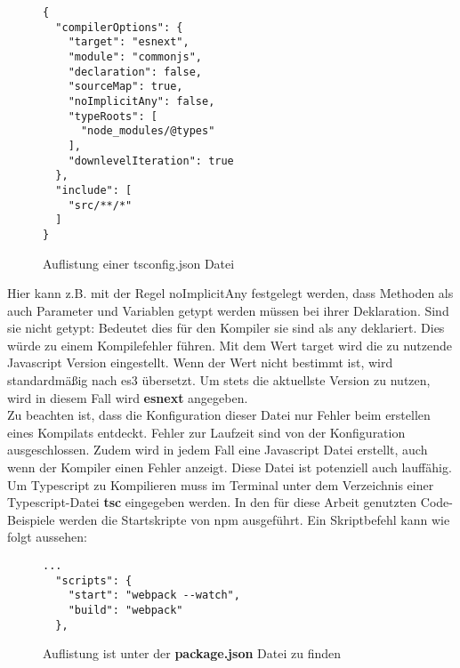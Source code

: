 \begin{figure}[H]
\begin{lstlisting}[basicstyle=\small]
{
  "compilerOptions": {
    "target": "esnext",
    "module": "commonjs",
    "declaration": false,
    "sourceMap": true,
    "noImplicitAny": false,
    "typeRoots": [
      "node_modules/@types"
    ],
    "downlevelIteration": true
  },
  "include": [
    "src/**/*"
  ]
} 
\end{lstlisting}
\caption{Auflistung einer tsconfig.json Datei}
\end{figure}

\noindent
Hier kann z.B. mit der Regel \glqq noImplicitAny\grqq{} festgelegt werden, dass Methoden als auch Parameter und Variablen getypt werden müssen bei ihrer Deklaration. Sind sie nicht getypt: Bedeutet dies für den Kompiler sie sind als any deklariert. Dies würde zu einem Kompilefehler führen.\cite{tsconfig} Mit dem Wert \glqq target\grqq{} wird die zu nutzende Javascript Version eingestellt. Wenn der Wert nicht bestimmt ist, wird standardmäßig nach es3 übersetzt. Um stets die aktuellste Version zu nutzen, wird in diesem Fall wird \textbf{esnext} angegeben.\\

\noindent
Zu beachten ist, dass die Konfiguration dieser Datei nur Fehler beim erstellen eines Kompilats entdeckt. Fehler zur Laufzeit sind von der Konfiguration ausgeschlossen. Zudem wird in jedem Fall eine Javascript Datei erstellt, auch wenn der Kompiler einen Fehler anzeigt. Diese Datei ist potenziell auch lauffähig. Um Typescript zu Kompilieren muss im Terminal unter dem Verzeichnis einer Typescript-Datei \textbf{tsc} eingegeben werden. In den für diese Arbeit genutzten Code-Beispiele werden die Startskripte von npm ausgeführt. Ein Skriptbefehl kann wie folgt aussehen:

\begin{figure}[H]
\begin{lstlisting}[basicstyle=\small]
  ...
  "scripts": {
    "start": "webpack --watch",
    "build": "webpack"
  }, 
\end{lstlisting}
\caption{Auflistung ist unter der \textbf{package.json} Datei zu finden}
\end{figure}

